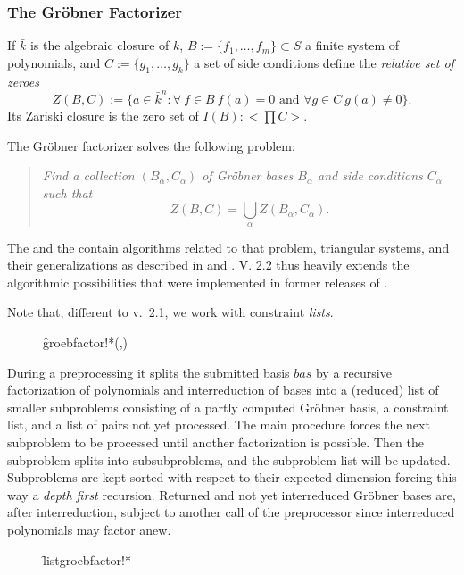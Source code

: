 \subsubsection{The Gr\"obner Factorizer}

If $\bar{k}$ is the algebraic closure of $k$,
$B:=\{f_1,\ldots,f_m\}\subset S$ a finite system of polynomials, and
$C:=\{g_1,\ldots,g_k\}$ a set of side conditions define the
\emph{relative set of zeroes}
\[Z(B,C):=\{a\in \bar{k}^n : \forall\ f\in B\ f(a)=0\mbox{ and }
\forall g\in C\ g(a)\neq 0\}.\]
Its Zariski closure is the zero set of $I(B):<\prod C>$.

The Gr\"obner factorizer solves the following problem:
\begin{quote}
\textit{Find a collection $(B_\alpha,C_\alpha)$ of Gr\"obner bases $B_\alpha$
and side conditions $C_\alpha$ such that}
\[Z(B,C) = \bigcup_\alpha Z(B_\alpha,C_\alpha).\]
\end{quote}
The  and the  contain algorithms
related to that problem, triangular systems, and their generalizations
as described in \cite{Graebe:94a} and \cite{Graebe:95b}. V. 2.2 thus heavily
extends the algorithmic possibilities that were implemented in former
releases of .

Note that, different to v.~2.1, we work with constraint \emph{lists}.
\begin{description}
\item[]
  \begin{syntax}
    \f{groebfactor!*}(,)
  \end{syntax}
  \hypertarget{procedure:GROEBFACTOR!*}{}
\end{description}
During a preprocessing it splits the submitted basis $bas$ by a
recursive factorization of polynomials and interreduction of bases
into a (reduced) list of smaller subproblems consisting of a partly
computed Gr\"obner basis, a constraint list, and a list of pairs not yet
processed. The main procedure forces the next subproblem to be
processed until another factorization is possible. Then the
subproblem splits into subsubproblems, and the subproblem list will
be updated. Subproblems are kept sorted with respect to their
expected dimension  forcing this way a \emph{depth first}
recursion.  Returned and not yet interreduced Gr\"obner bases are, after
interreduction, subject to another call of the preprocessor since
interreduced polynomials may factor anew.
\begin{description}
\item[]
  \begin{syntax}
    \f{listgroebfactor!*} 
  \end{syntax}
  \hypertarget{procedure:LISTGROEBFACTOR!*}{}
\end{description}
\medskip

